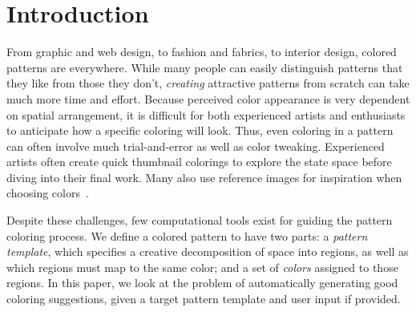 \section{Introduction}
\label{sec:introduction}

From graphic and web design, to fashion and fabrics, to interior design, colored patterns are everywhere. 
While many people can easily distinguish patterns that they like from those they don't, \emph{creating} attractive patterns from scratch can take much more time and effort. Because perceived color appearance is very dependent on spatial arrangement, it is difficult for both experienced artists and enthusiasts to anticipate how a specific coloring will look. Thus, even coloring in a pattern can often involve much trial-and-error as well as color tweaking. Experienced artists often create quick thumbnail colorings to explore the state space before diving into their final work. Many also use reference images for inspiration when choosing colors~\cite{ColorPaletteTools}.


Despite these challenges, few computational tools exist for guiding the pattern coloring process. We define a colored pattern to have two parts: a \emph{pattern template}, which specifies a creative decomposition of space into regions, as well as which regions must map to the same color; and a set of \emph{colors} assigned to those regions. In this paper, we look at the problem of automatically generating good coloring suggestions, given a target pattern template and user input if provided. 



